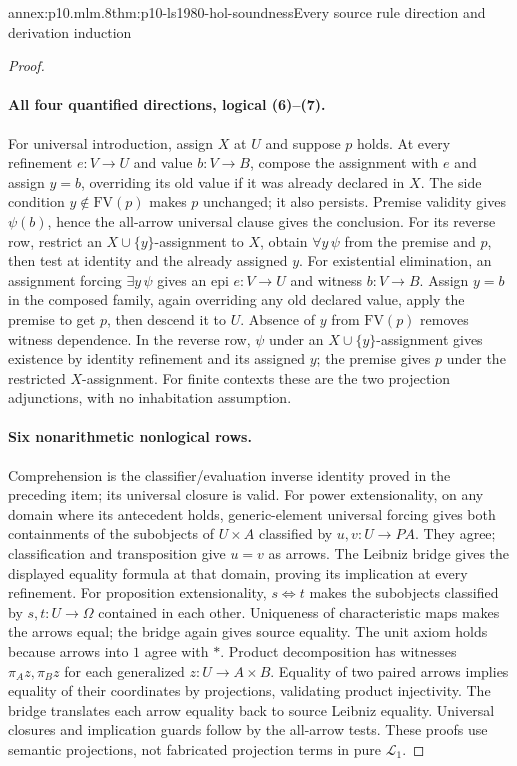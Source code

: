 \begin{annexitem}{annex:p10.mlm.8}{thm:p10-ls1980-hol-soundness}{Every source rule direction and derivation induction}
\begin{proof}
\paragraph{All four quantified directions, logical (6)--(7).}
For universal introduction, assign \(X\) at \(U\) and suppose \(p\) holds.
At every refinement \(e:V\to U\) and value \(b:V\to B\), compose the
assignment with \(e\) and assign \(y=b\), overriding its old value if it was
already declared in \(X\). The side condition \(y\notin\mathrm{FV}(p)\) makes
\(p\) unchanged; it also persists. Premise validity gives
\(\psi(b)\), hence the all-arrow universal clause gives the conclusion.
For its reverse row, restrict an \(X\cup\{y\}\)-assignment to \(X\), obtain
\(\forall y\,\psi\) from the premise and \(p\), then test at identity and
the already assigned \(y\).
For existential elimination, an assignment forcing \(\exists y\,\psi\)
gives an epi \(e:V\to U\) and witness \(b:V\to B\). Assign \(y=b\) in the
composed family, again overriding any old declared value, apply the premise
to get \(p\), then descend it to \(U\). Absence of \(y\) from \(\mathrm{FV}(p)\)
removes witness dependence. In the reverse row,
\(\psi\) under an \(X\cup\{y\}\)-assignment gives existence by identity
refinement and its assigned \(y\); the premise gives \(p\) under the
restricted \(X\)-assignment. For finite contexts these are the two
projection adjunctions, with no inhabitation assumption.

\paragraph{Six nonarithmetic nonlogical rows.}
Comprehension is the classifier/evaluation inverse identity proved in the
preceding item; its universal closure is valid.
For power extensionality, on any domain where its antecedent holds,
generic-element universal forcing gives both containments of the
subobjects of \(U\times A\) classified by \(u,v:U\to PA\). They agree;
classification and transposition give \(u=v\) as arrows. The Leibniz bridge
gives the displayed equality formula at that domain, proving its implication
at every refinement. For proposition extensionality, \(s\Leftrightarrow t\)
makes the subobjects classified by \(s,t:U\to\Omega\) contained in each
other. Uniqueness of characteristic maps makes the arrows equal; the bridge
again gives source equality.
The unit axiom holds because arrows into \(1\) agree with \(*\).
Product decomposition has witnesses \(\pi_Az,\pi_Bz\) for each generalized
\(z:U\to A\times B\). Equality of two paired arrows implies equality of
their coordinates by projections, validating product injectivity. The bridge
translates each arrow equality back to source Leibniz equality. Universal
closures and implication guards follow by the all-arrow tests. These proofs
use semantic projections, not fabricated projection terms in pure \(\mathcal L_1\).


\end{proof}
\end{annexitem}
